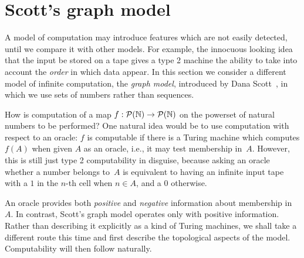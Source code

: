 \section{Scott's graph model}
\label{sec:graph-model}

A model of computation may introduce features which are not easily
detected, until we compare it with other models. For example, the
innocuous looking idea that the input be stored on a tape gives a type
2 machine the ability to take into account the \emph{order} in which
data appear. In this section we consider a different model of infinite
computation, the \emph{graph model}, introduced by Dana
Scott~, in which we use sets of numbers rather than
sequences.

How is computation of a map $f : \mathcal{P}(\mathbb{N}) \to \mathcal{P}(\mathbb{N})$ on the
powerset of natural numbers to be performed? One
natural idea would be to use computation with respect to an oracle:
$f$ is computable if there is a Turing machine which computes $f(A)$
when given $A$ as an oracle, i.e., it may test membership in~$A$.
However, this is still just type 2 computability in disguise, because
asking an oracle whether a number belongs to~$A$ is equivalent to
having an infinite input tape with a $1$ in the $n$-th cell when $n
\in A$, and a $0$ otherwise.

An oracle provides both \emph{positive} and \emph{negative}
information about membership in~$A$. In contrast, Scott's graph model operates
only with positive information. Rather than describing it explicitly as a
kind of Turing machines, we shall take a different route this time and
first describe the topological aspects of the model. Computability
will then follow naturally.

